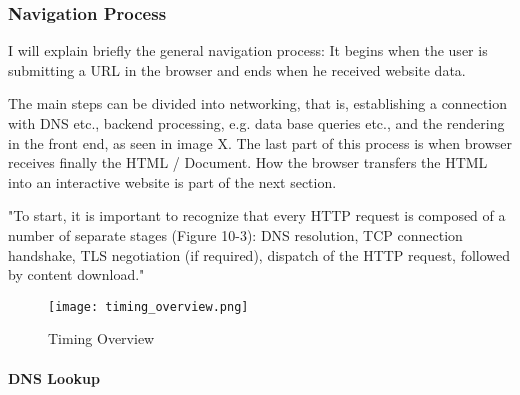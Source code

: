 


\subsubsection{Navigation Process}

I will explain briefly the general navigation process: It begins when the user is submitting a URL in the browser and ends when he received website data.

The main steps can be divided into networking, that is, establishing a connection with DNS etc., backend processing, e.g. data base queries etc., and the rendering in the front end, as seen in image X.
The last part of this process is when browser receives finally the HTML / Document. 
How the browser transfers the HTML into an interactive website is part of the next section.


"To start, it is important to recognize that every HTTP request is composed of a number of separate stages (Figure 10-3): DNS resolution, TCP connection handshake, TLS negotiation (if required), dispatch of the HTTP request, followed by content download." %



\begin{figure}[h!]
\begin{center}
\texttt{[image: timing\_overview.png]}
\caption{Timing Overview}
\label{img:timing_overview}
\end{center}
\end{figure}








\paragraph{DNS Lookup}

